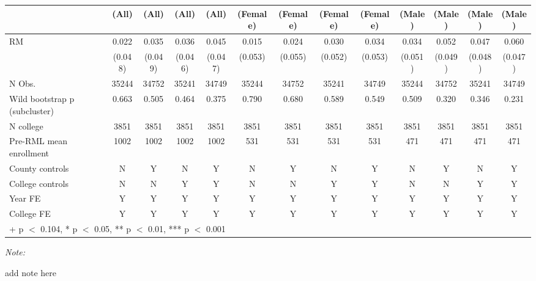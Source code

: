 \begin{table}
\centering
\begin{threeparttable}
\begin{tabular}[t]{lcccccccccccc}
\toprule
  & (All) & (All)  & (All)   & (All)    & (Female) & (Female)  & (Female)   & (Female)    & (Male) & (Male)  & (Male)   & (Male)   \\
\midrule
RM & \num{0.022} & \num{0.035} & \num{0.036} & \num{0.045} & \num{0.015} & \num{0.024} & \num{0.030} & \num{0.034} & \num{0.034} & \num{0.052} & \num{0.047} & \num{0.060}\\
 & (\num{0.048}) & (\num{0.049}) & (\num{0.046}) & (\num{0.047}) & (\num{0.053}) & (\num{0.055}) & (\num{0.052}) & (\num{0.053}) & (\num{0.051}) & (\num{0.049}) & (\num{0.048}) & (\num{0.047})\\
\midrule
N Obs. & \num{35244} & \num{34752} & \num{35241} & \num{34749} & \num{35244} & \num{34752} & \num{35241} & \num{34749} & \num{35244} & \num{34752} & \num{35241} & \num{34749}\\
Wild bootstrap p (subcluster) & 0.663 & 0.505 & 0.464 & 0.375 & 0.790 & 0.680 & 0.589 & 0.549 & 0.509 & 0.320 & 0.346 & 0.231\\
N college & 3851 & 3851 & 3851 & 3851 & 3851 & 3851 & 3851 & 3851 & 3851 & 3851 & 3851 & 3851\\
Pre-RML mean enrollment & 1002 & 1002 & 1002 & 1002 & 531 & 531 & 531 & 531 & 471 & 471 & 471 & 471\\
County controls & N & Y & N & Y & N & Y & N & Y & N & Y & N & Y\\
College controls & N & N & Y & Y & N & N & Y & Y & N & N & Y & Y\\
Year FE & Y & Y & Y & Y & Y & Y & Y & Y & Y & Y & Y & Y\\
College FE & Y & Y & Y & Y & Y & Y & Y & Y & Y & Y & Y & Y\\
\bottomrule
\multicolumn{13}{l}{\rule{0pt}{1em}+ p $<$ 0.104, * p $<$ 0.05, ** p $<$ 0.01, *** p $<$ 0.001}\\
\end{tabular}
\begin{tablenotes}
\item \textit{Note: } 
\item add note here
\end{tablenotes}
\end{threeparttable}
\end{table}
